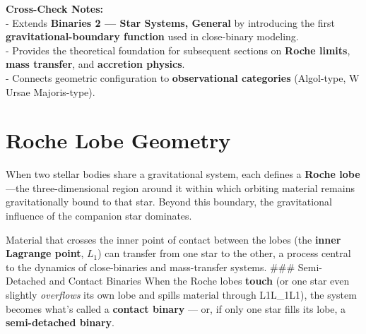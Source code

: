 \documentclass[
  letterpaper,
]{book}
\begin{document}
\textbf{Cross-Check Notes:}\\
- Extends \textbf{Binaries 2 --- Star Systems, General} by introducing
the first \textbf{gravitational-boundary function} used in close-binary
modeling.\\
- Provides the theoretical foundation for subsequent sections on
\textbf{Roche limits}, \textbf{mass transfer}, and \textbf{accretion
physics}.\\
- Connects geometric configuration to \textbf{observational categories}
(Algol-type, W Ursae Majoris-type).

\section{Roche Lobe Geometry}\label{roche-lobe-geometry}

When two stellar bodies share a gravitational system, each defines a
\textbf{Roche lobe}---the three-dimensional region around it within
which orbiting material remains gravitationally bound to that star.
Beyond this boundary, the gravitational influence of the companion star
dominates.

Material that crosses the inner point of contact between the lobes (the
\textbf{inner Lagrange point}, \(L_1\)) can transfer from one star to
the other, a process central to the dynamics of close-binaries and
mass-transfer systems. \#\#\# Semi-Detached and Contact Binaries When
the Roche lobes \textbf{touch} (or one star even slightly
\emph{overflows} its own lobe and spills material through
L1L\_1L1\hspace{0pt}), the system becomes what's called a
\textbf{contact binary} --- or, if only one star fills its lobe, a
\textbf{semi-detached binary}.
\end{document}
